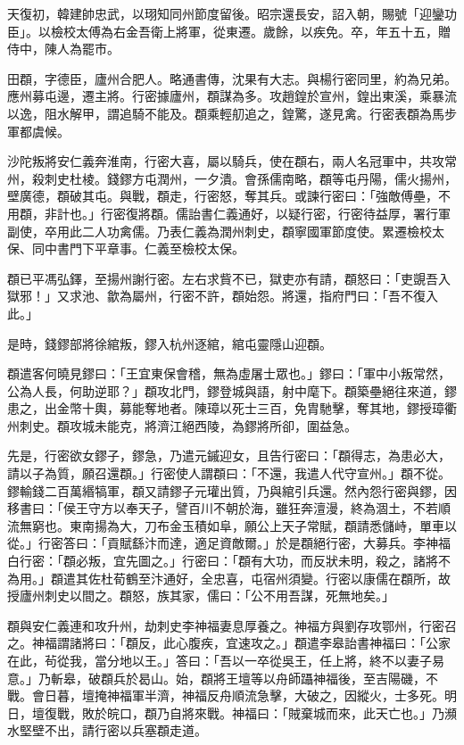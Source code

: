 \begin{pinyinscope}
 天復初，韓建帥忠武，以珝知同州節度留後。昭宗還長安，詔入朝，賜號「迎鑾功臣」。以檢校太傅為右金吾衛上將軍，從東遷。歲餘，以疾免。卒，年五十五，贈侍中，陳人為罷市。



 田頵，字德臣，廬州合肥人。略通書傳，沈果有大志。與楊行密同里，約為兄弟。應州募屯邊，遷主將。行密據廬州，頵謀為多。攻趙鍠於宣州，鍠出東溪，乘暴流以逸，阻水解甲，謂追騎不能及。頵乘輕舠追之，鍠驚，遂見禽。行密表頵為馬步軍都虞候。



 沙陀叛將安仁義奔淮南，行密大喜，屬以騎兵，使在頵右，兩人名冠軍中，共攻常州，殺刺史杜棱。錢鏐方屯潤州，一夕潰。會孫儒南略，頵等屯丹陽，儒火揚州，壁廣德，頵破其屯。與戰，頵走，行密怒，奪其兵。或諫行密曰：「強敵傅壘，不用頵，非計也。」行密復將頵。儒詒書仁義通好，以疑行密，行密待益厚，署行軍副使，卒用此二人功禽儒。乃表仁義為潤州刺史，頵寧國軍節度使。累遷檢校太保、同中書門下平章事。仁義至檢校太保。



 頵已平馮弘鐸，至揚州謝行密。左右求貲不已，獄吏亦有請，頵怒曰：「吏覬吾入獄邪！」又求池、歙為屬州，行密不許，頵始怨。將還，指府門曰：「吾不復入此。」



 是時，錢鏐部將徐綰叛，鏐入杭州逐綰，綰屯靈隱山迎頵。



 頵遣客何曉見鏐曰：「王宜東保會稽，無為虛屠士眾也。」鏐曰：「軍中小叛常然，公為人長，何助逆耶？」頵攻北門，鏐登城與語，射中麾下。頵築壘絕往來道，鏐患之，出金幣十輿，募能奪地者。陳璋以死士三百，免胄馳擊，奪其地，鏐授璋衢州刺史。頵攻城未能克，將濟江絕西陵，為鏐將所卻，圍益急。



 先是，行密欲女鏐子，鏐急，乃遣元鏚迎女，且告行密曰：「頵得志，為患必大，請以子為質，願召還頵。」行密使人謂頵曰：「不還，我遣人代守宣州。」頵不從。鏐輸錢二百萬緡犒軍，頵又請鏐子元瓘出質，乃與綰引兵還。然內怨行密與鏐，因移書曰：「侯王守方以奉天子，譬百川不朝於海，雖狂奔澶漫，終為涸土，不若順流無窮也。東南揚為大，刀布金玉積如阜，願公上天子常賦，頵請悉儲峙，單車以從。」行密答曰：「貢賦繇汴而達，適足資敵爾。」於是頵絕行密，大募兵。李神福白行密：「頵必叛，宜先圖之。」行密曰：「頵有大功，而反狀未明，殺之，諸將不為用。」頵遣其佐杜荀鶴至汴通好，全忠喜，屯宿州須變。行密以康儒在頵所，故授廬州刺史以間之。頵怒，族其家，儒曰：「公不用吾謀，死無地矣。」



 頵與安仁義連和攻升州，劫刺史李神福妻息厚養之。神福方與劉存攻鄂州，行密召之。神福謂諸將曰：「頵反，此心腹疾，宜速攻之。」頵遣李皋詒書神福曰：「公家在此，茍從我，當分地以王。」答曰：「吾以一卒從吳王，任上將，終不以妻子易意。」乃斬皋，破頵兵於曷山。始，頵將王壇等以舟師躡神福後，至吉陽磯，不戰。會日暮，壇掩神福軍半濟，神福反舟順流急擊，大破之，因縱火，士多死。明日，壇復戰，敗於皖口，頵乃自將來戰。神福曰：「賊棄城而來，此天亡也。」乃瀕水堅壁不出，請行密以兵塞頵走道。




\end{pinyinscope}
